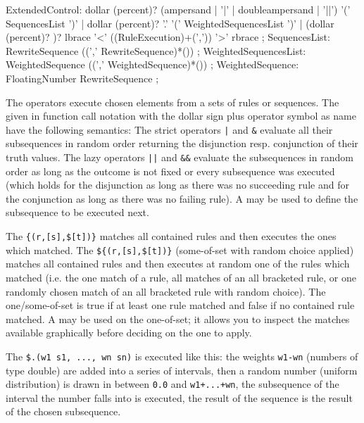 \begin{rail} 
  ExtendedControl: 
	dollar (percent)? (ampersand | '|' | doubleampersand | '||') '(' SequencesList ')' |
	dollar (percent)? '.' '(' WeightedSequencesList ')' |
	(dollar (percent)? )? lbrace '<' ((RuleExecution)+(',')) '>' rbrace
	;
  SequencesList:
	RewriteSequence ((',' RewriteSequence)*())
	;
  WeightedSequencesList:
	WeightedSequence ((',' WeightedSequence)*())
	;
  WeightedSequence:
	FloatingNumber RewriteSequence
	;
\end{rail}

The  operators execute chosen elements from a sets of rules or sequences.
The  given in function call notation with the dollar sign plus operator symbol as name have the following semantics:
The strict operators \verb/|/ and \verb/&/ evaluate all their subsequences in random order returning the disjunction resp. conjunction of their truth values.
The lazy operators \verb/||/ and \verb/&&/ evaluate the subsequences in random order as long as the outcome is not fixed or every subsequence was executed 
(which holds for the disjunction as long as there was no succeeding rule and for the conjunction as long as there was no failing rule).
A  may be used to define the subsequence to be executed next.

The  \verb/{(r,[s],$[t])}/ matches all contained rules and then executes the ones which matched.
The  \verb/${(r,[s],$[t])}/ (some-of-set with random choice applied) matches all contained rules and then executes at random one of the rules which matched
(i.e. the one match of a rule, all matches of an all bracketed rule, or one randomly chosen match of an all bracketed rule with random choice).
The one/some-of-set is true if at least one rule matched and false if no contained rule matched.
A  may be used on the one-of-set; it allows you to inspect the matches available graphically before deciding on the one to apply. 

The  \verb/$.(w1 s1, ..., wn sn)/ is executed like this:
the weights \texttt{w1-wn} (numbers of type double) are added into a series of intervals,
then a random number (uniform distribution) is drawn in between \texttt{0.0} and \texttt{w1+...+wn},
the subsequence of the interval the number falls into is executed,
the result of the sequence is the result of the chosen subsequence.


